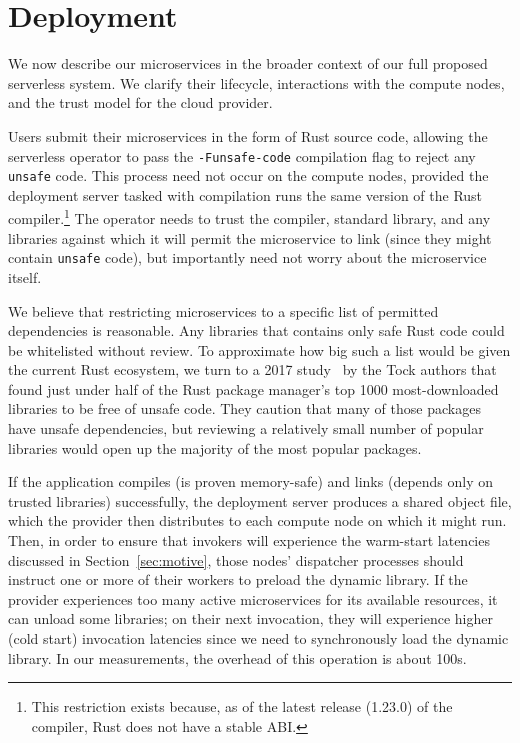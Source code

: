 \section{Deployment}
\label{sec:deploy}

We now describe our microservices in the broader context of our full proposed
serverless system.  We clarify their lifecycle, interactions with the compute nodes,
and the trust model for the cloud provider.

Users submit their microservices in the form of Rust source code, allowing the
serverless operator to pass the \texttt{-Funsafe-code} compilation flag to reject
any \texttt{unsafe} code.  This process need not occur on the compute
nodes, provided the deployment server tasked with compilation runs the same version
of the Rust compiler.\footnote{This restriction exists because, as of the latest
release (1.23.0) of the compiler, Rust does not have a stable ABI.}  The operator
needs to trust the compiler, standard library, and any libraries against which it
will permit the microservice to link (since they might contain \texttt{unsafe} code),
but importantly need not worry about the microservice itself.

We believe that restricting microservices to a specific
list of permitted dependencies is reasonable.  Any libraries that contains only
safe Rust code could be whitelisted without review.  To approximate how big such a
list would be given the current Rust ecosystem, we turn to a 2017
study~\cite{www-cratesio-unsafe} by the Tock authors that found just under half of
the Rust package manager's top 1000 most-downloaded libraries to be free of
unsafe code.  They caution that many of those packages have unsafe
dependencies, but reviewing a relatively small number of popular
libraries would open up the majority of the most popular packages.

If the application compiles (is proven memory-safe) and links (depends only on
trusted libraries) successfully, the deployment server produces a shared object file,
which the provider then distributes to each compute node on which it might run.
Then, in order to ensure that invokers will experience the warm-start latencies
discussed in Section~\ref{sec:motive}, those nodes' dispatcher processes should
instruct one or more of their workers to preload the dynamic library.  If the
provider experiences too many active microservices for its available resources, it
can unload some libraries; on their next invocation, they will experience higher
(cold start) invocation latencies since we need to synchronously load the dynamic
library.  In our measurements, the overhead of this operation is about 100\textmu{}s.
